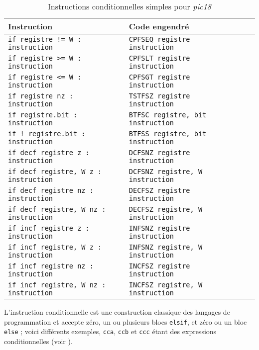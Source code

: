 \begin{table}[!ht]
  \centering
  \small
  \begin{tabular}{lp{4cm}lll}
    \textbf{Instruction} & \textbf{Code engendré}\\
    \hline
    \texttt{if registre != W : instruction} & \texttt{CPFSEQ registre instruction} \\
    \texttt{if registre >= W : instruction} & \texttt{CPFSLT registre instruction} \\
    \texttt{if registre <= W : instruction} & \texttt{CPFSGT registre instruction} \\
    \texttt{if registre nz : instruction} & \texttt{TSTFSZ registre instruction} \\
    \texttt{if registre.bit : instruction} & \texttt{BTFSC registre, bit instruction} \\
    \texttt{if ! registre.bit : instruction} & \texttt{BTFSS registre, bit instruction} \\
    \texttt{if decf registre z : instruction} & \texttt{DCFSNZ registre instruction} \\
    \texttt{if decf registre, W z : instruction} & \texttt{DCFSNZ registre, W instruction} \\
    \texttt{if decf registre nz : instruction} & \texttt{DECFSZ registre instruction} \\
    \texttt{if decf registre, W nz : instruction} & \texttt{DECFSZ registre, W instruction} \\
    \texttt{if incf registre z : instruction} & \texttt{INFSNZ registre instruction} \\
    \texttt{if incf registre, W z : instruction} & \texttt{INFSNZ registre, W instruction} \\
    \texttt{if incf registre nz : instruction} & \texttt{INCFSZ registre instruction} \\
    \texttt{if incf registre, W nz : instruction} & \texttt{INCFSZ registre, W instruction} \\
    \hline
  \end{tabular}
  \caption{Instructions conditionnelles simples pour \emph{pic18}}
\end{table}





L'instruction conditionnelle est une construction classique des langages de programmation et accepte zéro, un ou plusieurs blocs \texttt{elsif}, et zéro ou un bloc \texttt{else} ; voici différents exemples, \texttt{cca}, \texttt{ccb} et \texttt{ccc} étant des expressions conditionnelles (voir ).


